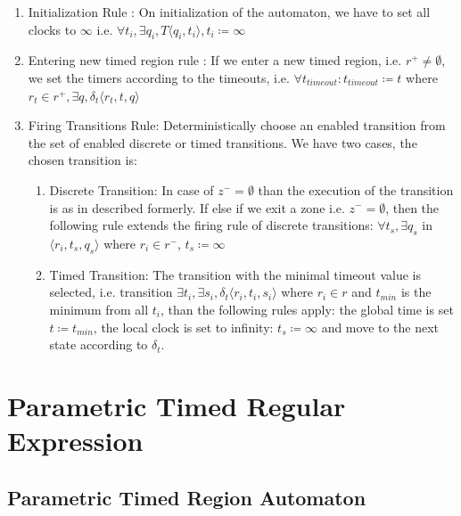 			\begin{enumerate}
				\item Initialization Rule : On initialization of the automaton, we have to set all clocks to $\infty$ 
				i.e. $\forall t_i, \exists q_i, T \langle q_i, t_i \rangle, t_i \coloneqq \infty $
			
				\item Entering new timed region rule :
				If we enter a new timed region, 
				i.e. $r^+ \neq \emptyset$, 
				we set the timers according to the timeouts, 
				i.e. $\forall t_{timeout} : t_{timeout} \coloneqq t$ where $ r_t \in r^+, \exists q ,\delta_t\langle  r_t,t,q \rangle$
				
				\item Firing Transitions Rule: Deterministically choose an enabled transition from the set of enabled discrete or timed transitions. 
				We have two cases, the chosen transition is:
					\begin{enumerate}
						\item Discrete Transition: In case of $z^- = \emptyset$ than the execution of the transition is as in described formerly. 
						If else if we exit a zone i.e. $z^- = \emptyset$, 
						then the following rule extends the firing rule of discrete transitions:
							$\forall t_s, \exists q_s$ in $\langle r_i, t_s, q_s \rangle$ where $r_i \in r^-$, $t_s \coloneqq \infty$
						\item Timed Transition: The transition with the minimal timeout value is selected, 
						 i.e. transition $\exists t_i, \exists s_i, \delta_t \langle r_i, t_i, s_i \rangle$ where $ r_i \in r$ and $t_{min}$ is the minimum from all $t_i$,
						 than the following rules apply:
						 the global time is set $t \coloneqq t_{min}$, the local clock is set to infinity: $t_s \coloneqq \infty$ and move to the next state according to $\delta_t$.
					\end{enumerate}			
			\end{enumerate}


		
	\section{Parametric Timed Regular Expression}
	
		\subsection{Parametric Timed Region Automaton}
					
